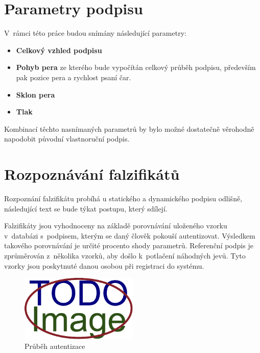 \newpage

\section{Parametry podpisu}
V~rámci této práce budou snímány následující parametry:
\begin{itemize}
  \item{\textbf{Celkový vzhled podpisu}}
  \item{\textbf{Pohyb pera} ze kterého bude vypočítán celkový průběh podpisu, především pak pozice pera a rychlost psaní čar.} %
  \item{\textbf{Sklon pera}} %
  \item{\textbf{Tlak}} %
\end{itemize}
Kombinací těchto nasnímaných parametrů by bylo možné dostatečně věrohodně napodobit původní vlastnoruční podpis. 

\section{Rozpoznávání falzifikátů}
Rozpoznání falzifikátu probíhá u statického a dynamického podpisu odlišně, následující text se bude týkat postupu, který sdílejí.

Falzifikáty jsou vyhodnoceny na základě porovnávání uloženého vzorku v~databázi s~podpisem, kterým se daný člověk pokouší autentizovat.
Výsledkem takového porovnávání je určité procento shody parametrů.
Referenční podpis je zprůměrován z~několika vzorků, aby došlo k~potlačení náhodných jevů. %
Tyto vzorky jsou poskytnuté danou osobou při registraci do systému.

\begin{figure}[h]
  \centering
  \includegraphics[width=0.5\textwidth]{obrazky-figures/placeholder.pdf}
  \caption{Průběh autentizace}
  \label{fig:my-pdf}
\end{figure}

